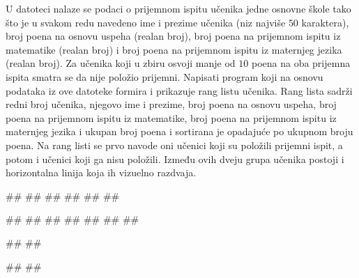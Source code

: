 \begin{Exercise}[label=705]
  U datoteci  nalaze se podaci o prijemnom ispitu učenika jedne osnovne škole tako što je u svakom redu navedeno ime i prezime učenika (niz najviše $50$ karaktera), broj poena na osnovu uspeha (realan broj), broj poena na prijemnom ispitu iz matematike (realan broj) i broj poena na prijemnom ispitu iz maternjeg jezika (realan broj). Za učenika koji u zbiru osvoji manje od $10$ poena na oba prijemna ispita smatra se da nije položio prijemni. Napisati program koji na osnovu podataka iz ove datoteke formira i prikazuje rang listu učenika. Rang lista sadrži redni broj učenika, njegovo ime i prezime, broj poena na osnovu uspeha, broj poena na prijemnom ispitu iz matematike, broj poena na prijemnom ispitu iz maternjeg jezika i ukupan broj poena i sortirana je opadajuće po ukupnom broju poena. Na rang listi se prvo navode oni učenici koji su položili prijemni ispit, a potom i učenici koji ga nisu položili. Između ovih dveju grupa učenika postoji i horizontalna linija koja ih vizuelno razdvaja.

\begin{miditest}
\begin{test}{1}
##
##
##       
##         
##
##
  
#\naslovIzlaz#
##
##
##
##
#\izlaz{-----------------------------------}#
##
\end{test}
\end{miditest}
\begin{miditest}
\begin{test}{2}
##
##
  
#\naslovIzlaz#
##
\end{test}
\end{miditest}

\end{Exercise}
\begin{Answer}[ref=705]
\end{Answer}

